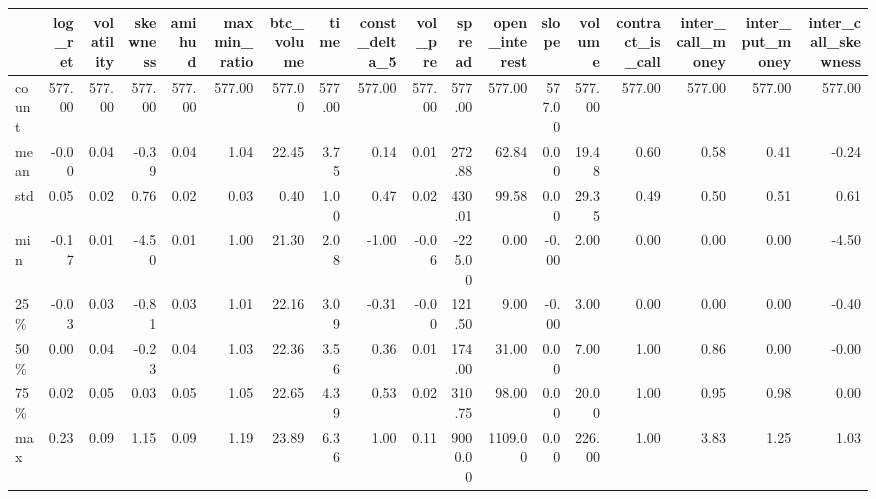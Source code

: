 \begin{tabular}{lrrrrrrrrrrrrrrrrr}
\toprule
{} &  log\_ret &  volatility &  skewness &  amihud &  maxmin\_ratio &  btc\_volume &   time &  const\_delta\_5 &  vol\_pre &  spread &  open\_interest &  slope &  volume &  contract\_is\_call &  inter\_call\_money &  inter\_put\_money &  inter\_call\_skewness \\
\midrule
count &   577.00 &      577.00 &    577.00 &  577.00 &        577.00 &      577.00 & 577.00 &         577.00 &   577.00 &  577.00 &         577.00 & 577.00 &  577.00 &            577.00 &            577.00 &           577.00 &               577.00 \\
mean  &    -0.00 &        0.04 &     -0.39 &    0.04 &          1.04 &       22.45 &   3.75 &           0.14 &     0.01 &  272.88 &          62.84 &   0.00 &   19.48 &              0.60 &              0.58 &             0.41 &                -0.24 \\
std   &     0.05 &        0.02 &      0.76 &    0.02 &          0.03 &        0.40 &   1.00 &           0.47 &     0.02 &  430.01 &          99.58 &   0.00 &   29.35 &              0.49 &              0.50 &             0.51 &                 0.61 \\
min   &    -0.17 &        0.01 &     -4.50 &    0.01 &          1.00 &       21.30 &   2.08 &          -1.00 &    -0.06 & -225.00 &           0.00 &  -0.00 &    2.00 &              0.00 &              0.00 &             0.00 &                -4.50 \\
25\%   &    -0.03 &        0.03 &     -0.81 &    0.03 &          1.01 &       22.16 &   3.09 &          -0.31 &    -0.00 &  121.50 &           9.00 &  -0.00 &    3.00 &              0.00 &              0.00 &             0.00 &                -0.40 \\
50\%   &     0.00 &        0.04 &     -0.23 &    0.04 &          1.03 &       22.36 &   3.56 &           0.36 &     0.01 &  174.00 &          31.00 &   0.00 &    7.00 &              1.00 &              0.86 &             0.00 &                -0.00 \\
75\%   &     0.02 &        0.05 &      0.03 &    0.05 &          1.05 &       22.65 &   4.39 &           0.53 &     0.02 &  310.75 &          98.00 &   0.00 &   20.00 &              1.00 &              0.95 &             0.98 &                 0.00 \\
max   &     0.23 &        0.09 &      1.15 &    0.09 &          1.19 &       23.89 &   6.36 &           1.00 &     0.11 & 9000.00 &        1109.00 &   0.00 &  226.00 &              1.00 &              3.83 &             1.25 &                 1.03 \\
\bottomrule
\end{tabular}
